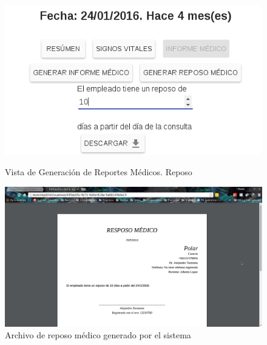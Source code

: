     \begin{figure}[htb!]
        \begin{minipage}{0.45\textwidth}
            \begin{center}
                \includegraphics[width=\linewidth,keepaspectratio=true]{figures/reportes-reposonav}
            \end{center}
            \caption{Vista de Generación de Reportes Médicos. Reposo}
            \label{reportes-reposonav}
        \end{minipage}
        \hspace*{\fill}
        \begin{minipage}{0.45\textwidth}
            \begin{center}
                \includegraphics[width=\linewidth,keepaspectratio=true]{figures/reportes-reposopdf}
            \end{center}
            \caption{Archivo de reposo médico generado por el sistema}
            \label{reportes-reposopdf}
        \end{minipage}
    \end{figure}
    
